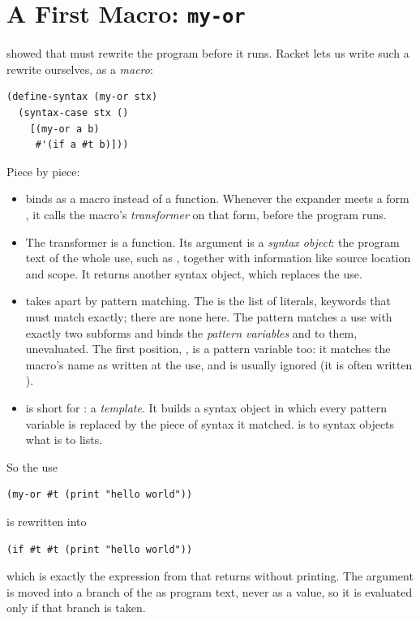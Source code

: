 \section{A First Macro: \texttt{my-or}}
\label{sec:myor}

 showed that  must rewrite the program before it runs. Racket lets us write such a rewrite ourselves, as a \emph{macro}:
\begin{lstlisting}
(define-syntax (my-or stx)
  (syntax-case stx ()
    [(my-or a b)
     #'(if a #t b)]))
\end{lstlisting}
Piece by piece:
\begin{itemize}
  \item {} binds  as a macro instead of a function. Whenever the expander meets a form , it calls the macro's \emph{transformer} on that form, before the program runs.
  \item The transformer is a function. Its argument  is a \emph{syntax object}: the program text of the whole use, such as , together with information like source location and scope. It returns another syntax object, which replaces the use.
  \item {} takes  apart by pattern matching. The \code{()} is the list of literals, keywords that must match exactly; there are none here. The pattern  matches a use with exactly two subforms and binds the \emph{pattern variables}  and  to them, unevaluated. The first position, , is a pattern variable too: it matches the macro's name as written at the use, and is usually ignored (it is often written \code{\_}).
  \item {} is short for : a \emph{template}. It builds a syntax object in which every pattern variable is replaced by the piece of syntax it matched.  is to syntax objects what  is to lists.
\end{itemize}

So the use
\begin{lstlisting}
(my-or #t (print "hello world"))
\end{lstlisting}
is rewritten into
\begin{lstlisting}
(if #t #t (print "hello world"))
\end{lstlisting}
which is exactly the expression from  that returns  without printing. The argument  is moved into a branch of the  as program text, never as a value, so it is evaluated only if that branch is taken.

